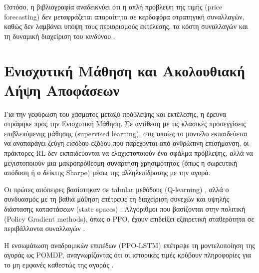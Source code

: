 Ωστόσο, η βιβλιογραφία αναδεικνύει ότι η απλή πρόβλεψη της τιμής (price forecasting) δεν 
μεταφράζεται απαραίτητα σε κερδοφόρα στρατηγική συναλλαγών, καθώς δεν λαμβάνει υπόψη τους 
περιορισμούς εκτέλεσης, τα κόστη συναλλαγών και τη δυναμική διαχείριση του κινδύνου \cite{moody2001rltrading}.

\section{Ενισχυτική Μάθηση και Ακολουθιακή Λήψη Αποφάσεων}
Για την γεφύρωση του χάσματος μεταξύ πρόβλεψης και εκτέλεσης, η έρευνα στράφηκε προς την 
Ενισχυτική Μάθηση. Σε αντίθεση με τις κλασικές προσεγγίσεις επιβλεπόμενης μάθησης 
(supervised learning), στις οποίες το μοντέλο εκπαιδεύεται να αναπαράγει ζεύγη εισόδου-εξόδου 
που παρέχονται από ανθρώπινη επισήμανση, οι πράκτορες RL δεν εκπαιδεύονται να ελαχιστοποιούν 
ένα σφάλμα πρόβλεψης, αλλά να μεγιστοποιούν μια μακροπρόθεσμη συνάρτηση χρησιμότητας (όπως η 
σωρευτική απόδοση ή ο δείκτης Sharpe) μέσω της αλληλεπίδρασης με την αγορά.

Οι πρώτες απόπειρες βασίστηκαν σε tabular μεθόδους (Q-learning) \cite{neuneier1998qlearning}, αλλά ο συνδυασμός με τη βαθιά
μάθηση επέτρεψε τη διαχείριση συνεχών και υψηλής διάστασης καταστάσεων (state spaces)
\cite{liu2018finrl}. Αλγόριθμοι που βασίζονται στην πολιτική (Policy Gradient methods), 
όπως ο PPO, έχουν επιδείξει εξαιρετική σταθερότητα σε περιβάλλοντα συναλλαγών \cite{yang2020ensemble}. 

Η ενσωμάτωση αναδρομικών επιπέδων (PPO-LSTM) επέτρεψε τη μοντελοποίηση της αγοράς ως POMDP, 
αναγνωρίζοντας ότι οι ιστορικές τιμές κρύβουν πληροφορίες για το μη εμφανές καθεστώς της
αγοράς \cite{kaelbling1998pomdp, hausknecht2015drqn}.

